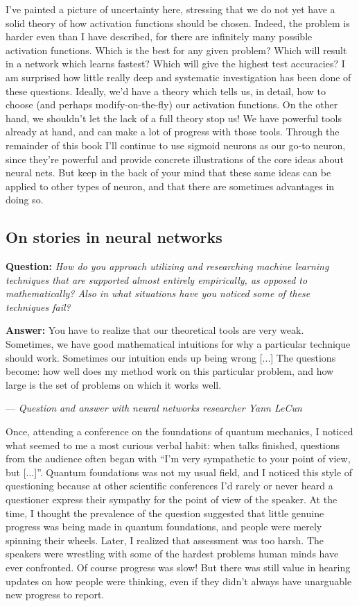 \documentclass[a4paper,twoside,10pt]{book}
\begin{document}
I've painted a picture of uncertainty here, stressing that we do not yet have a solid theory of how activation functions should be chosen. Indeed, the problem is harder even than I have described, for there are infinitely many possible activation functions. Which is the best for any given problem? Which will result in a network which learns fastest? Which will give the highest test accuracies? I am surprised how little really deep and systematic investigation has been done of these questions. Ideally, we'd have a theory which tells us, in detail, how to choose (and perhaps modify-on-the-fly) our activation functions. On the other hand, we shouldn't let the lack of a full theory stop us! We have powerful tools already at hand, and can make a lot of progress with those tools. Through the remainder of this book I'll continue to use sigmoid neurons as our go-to neuron, since they're powerful and provide concrete illustrations of the core ideas about neural nets. But keep in the back of your mind that these same ideas can be applied to other types of neuron, and that there are sometimes advantages in doing so.

\subsection*{On stories in neural networks}
\begin{adjustwidth}{1.5cm}{1cm}
\textbf{Question:} \textit{How do you approach utilizing and researching machine learning techniques that are supported almost entirely empirically, as opposed to mathematically? Also in what situations have you noticed some of these techniques fail?}

\noindent\textbf{Answer:} You have to realize that our theoretical tools are very weak. Sometimes, we have good mathematical intuitions for why a particular technique should work. Sometimes our intuition ends up being wrong [...] The questions become: how well does my method work on this particular problem, and how large is the set of problems on which it works well.

--- \textit{Question and answer with neural networks researcher Yann LeCun}
\end{adjustwidth}
Once, attending a conference on the foundations of quantum mechanics, I noticed what seemed to me a most curious verbal habit: when talks finished, questions from the audience often began with ``I'm very sympathetic to your point of view, but [...]''. Quantum foundations was not my usual field, and I noticed this style of questioning because at other scientific conferences I'd rarely or never heard a questioner express their sympathy for the point of view of the speaker. At the time, I thought the prevalence of the question suggested that little genuine progress was being made in quantum foundations, and people were merely spinning their wheels. Later, I realized that assessment was too harsh. The speakers were wrestling with some of the hardest problems human minds have ever confronted. Of course progress was slow! But there was still value in hearing updates on how people were thinking, even if they didn't always have unarguable new progress to report.
\end{document}
